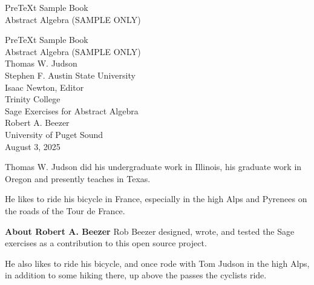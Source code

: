 \documentclass[oneside,10pt,]{book}
\newcommand{\titlepagefont}{\relax}
\numberwithin{equation}{section}
\begin{document}
\raggedbottom
\setcounter{page}{0}%
%
\frontmatter
\thispagestyle{empty}
{\titlepagefont\centering
\vspace*{0.28\textheight}
{\Huge PreTeXt Sample Book}\\[2\baselineskip]
{\LARGE Abstract Algebra (SAMPLE ONLY)}\\
}
\clearpage
\thispagestyle{empty}
{\titlepagefont\centering
\vspace*{0.14\textheight}
{\Huge PreTeXt Sample Book}\\[\baselineskip]
{\LARGE Abstract Algebra (SAMPLE ONLY)}\\[3\baselineskip]
{\Large Thomas W. Judson}\\[0.5\baselineskip]
{\Large Stephen F. Austin State University}\\[3\baselineskip]
{\Large Isaac Newton, Editor}\\[0.5\baselineskip]
{\Large Trinity College}\\[3\baselineskip]
{\Large Sage Exercises for Abstract Algebra}\\[0.5\baselineskip]
{\normalsize Robert A. Beezer}\\[0.25\baselineskip]
University of Puget Sound\\
[3\baselineskip]
{\Large August 3, 2025}\\}
\clearpage
\thispagestyle{empty}
\hypertarget{front-colophon}{}\noindent
Thomas W. Judson did his undergraduate work in Illinois, his graduate work in Oregon and presently teaches in Texas.%
\par
He likes to ride his bicycle in France, especially in the high Alps and Pyrenees on the roads of the Tour de France.%
\par
\bigskip\noindent\textbf{About Robert A. Beezer}\space\space
Rob Beezer designed, wrote, and tested the Sage exercises as a contribution to this open source project.%
\par
He also likes to ride his bicycle, and once rode with Tom Judson in the high Alps, in addition to some hiking there, up above the passes the cyclists ride.%
\par
\end{document}

